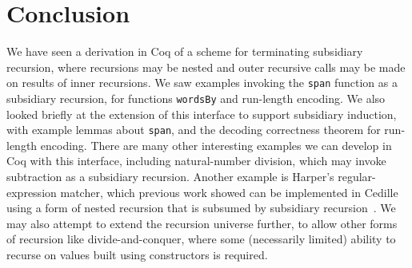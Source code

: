 \documentclass[a4paper,USenglish]{lipics-v2021}
\begin{document}
\section{Conclusion}

We have seen a derivation in Coq of a scheme for terminating
subsidiary recursion, where recursions may be nested and outer
recursive calls may be made on results of inner recursions.  We saw
examples invoking the \verb|span| function as a subsidiary recursion,
for functions \verb|wordsBy| and run-length encoding.  We also looked
briefly at the extension of this interface to support subsidiary
induction, with example lemmas about \verb|span|, and the decoding
correctness theorem for run-length encoding.  There are many other
interesting examples we can develop in Coq with this interface,
including natural-number division, which may invoke subtraction as a
subsidiary recursion.  Another example is Harper's regular-expression
matcher, which previous work showed can be implemented in Cedille
using a form of nested recursion that is subsumed by subsidiary
recursion~\cite{stump20}.  We may also attempt to extend the recursion
universe further, to allow other forms of recursion like
divide-and-conquer, where some (necessarily limited) ability to
recurse on values built using constructors is required.

\pagebreak

\end{document}
